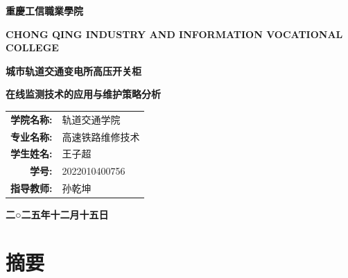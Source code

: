 \documentclass[a4paper,12pt]{article}
\begin{document}
\begin{titlepage}
    \centering
    \vspace*{1cm}
    {\Huge \textbf{重慶工信職業學院} \par}
    \vspace{0.5cm}
    {\Large \textbf{CHONG QING INDUSTRY AND INFORMATION VOCATIONAL COLLEGE} \par}

    \vspace{3cm}

    {\Huge \textbf{城市轨道交通变电所高压开关柜} \par}
    {\Huge \textbf{在线监测技术的应用与维护策略分析} \par}

    \vspace{4cm}

    \begin{large}
        \begin{tabular}{rl}
            \textbf{学院名称:} & 轨道交通学院 \\
            \textbf{专业名称:} & 高速铁路维修技术 \\
            \textbf{学生姓名:} & 王子超 \\
            \textbf{学号:}   & 2022010400756 \\
            \textbf{指导教师:} & 孙乾坤 \\
        \end{tabular}
    \end{large}

    \vspace{3cm}

    {\Large \textbf{二○二五年十二月十五日} \par}

\end{titlepage}

\chapter*{摘要}



\tableofcontents
\clearpage








\end{document}
